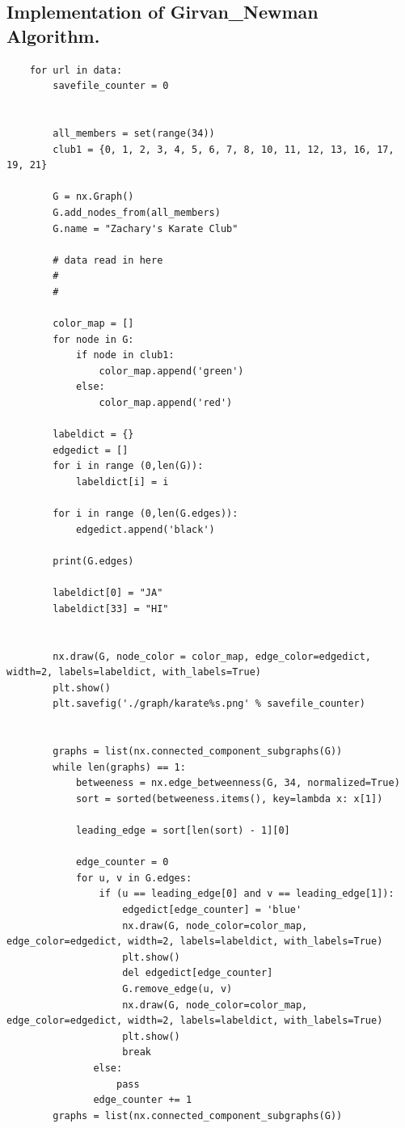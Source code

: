 \documentclass[11pt]{article}
\begin{document}
	\subsection{Implementation of Girvan\_Newman Algorithm. }
	\begin{lstlisting}
	for url in data:
	    savefile_counter = 0
	    
	    
	    all_members = set(range(34))
	    club1 = {0, 1, 2, 3, 4, 5, 6, 7, 8, 10, 11, 12, 13, 16, 17, 19, 21}
	    
	    G = nx.Graph()
	    G.add_nodes_from(all_members)
	    G.name = "Zachary's Karate Club"
	    
	    # data read in here
	    #
	    #
	    
	    color_map = []
	    for node in G:
	        if node in club1:
	            color_map.append('green')
	        else:
	            color_map.append('red')
	    
	    labeldict = {}
	    edgedict = []
	    for i in range (0,len(G)):
	        labeldict[i] = i
	    
	    for i in range (0,len(G.edges)):
	        edgedict.append('black')
	    
	    print(G.edges)
	    
	    labeldict[0] = "JA"
	    labeldict[33] = "HI"
	    
	    
	    nx.draw(G, node_color = color_map, edge_color=edgedict, width=2, labels=labeldict, with_labels=True)
	    plt.show()
	    plt.savefig('./graph/karate%s.png' % savefile_counter)
	    
	    
	    graphs = list(nx.connected_component_subgraphs(G))	    
	    while len(graphs) == 1:
	        betweeness = nx.edge_betweenness(G, 34, normalized=True)
	        sort = sorted(betweeness.items(), key=lambda x: x[1])
	    
	        leading_edge = sort[len(sort) - 1][0]
	    
	        edge_counter = 0
	        for u, v in G.edges:
	            if (u == leading_edge[0] and v == leading_edge[1]):
	                edgedict[edge_counter] = 'blue'
	                nx.draw(G, node_color=color_map, edge_color=edgedict, width=2, labels=labeldict, with_labels=True)
	                plt.show()
	                del edgedict[edge_counter]
	                G.remove_edge(u, v)
	                nx.draw(G, node_color=color_map, edge_color=edgedict, width=2, labels=labeldict, with_labels=True)
	                plt.show()
	                break
	           else:
	               pass
	           edge_counter += 1
	    graphs = list(nx.connected_component_subgraphs(G))
	\end{lstlisting}
\end{document}
